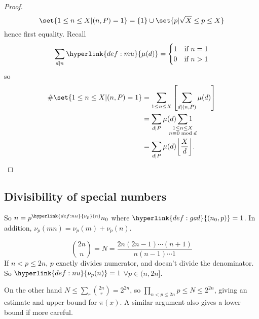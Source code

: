 \documentclass{article}
\DeclarePairedDelimiter\floor{\lfloor}{\rfloor}
\begin{document}
\begin{proof}
    \begin{equation*}
        \set{1 \leq n \leq X | (n, P) = 1} = \{1\} \cup \set{p | \sqrt{X} \leq p \leq X}
    \end{equation*}
    hence first equality. Recall
    \begin{gather*}
        \sum_{d \mid n} \hyperlink{def:mu}{\mu(d)} =
        \begin{cases}
            1 & \text{if } n = 1 \\
            0 & \text{if } n > 1
        \end{cases}
    \end{gather*}
        so
    \begin{align*}
        \# \set{1 \leq n \leq X | (n, P) = 1} &= \sum_{1 \leq n \leq X} \left[ \sum_{d \mid (n, P)} \mu(d)\right] \\
                                              &= \sum_{d \mid P} \mu(d) \sum_{\mathclap{\substack{1 \leq n \leq X \\ n \equiv 0 \bmod{d}}}} 1 \\
                                              &= \sum_{d \mid P} \mu(d) \floor*{\frac{X}{d}}. \qedhere
    \end{align*}
\end{proof}

\subsection{Divisibility of special numbers}

So $n = p^{\hyperlink{def:nu}{\nu_p}(n)} n_0$ where $\hyperlink{def:gcd}{(n_0, p)} = 1$.
In addition, $\nu_p(mn) = \nu_p(m) + \nu_p(n)$.

\begin{eg}
    \begin{equation*}
        \binom{2n}{n} = N = \frac{2n (2n-1) \dotsm (n+1)}{n (n-1) \dotsm 1}
    \end{equation*}
    If $n < p \leq 2n$, $p$ exactly divides numerator, and doesn't divide the denominator.
    So $\hyperlink{def:nu}{\nu_p(n)} = 1$ $\forall p \in (n, 2n]$.

    On the other hand $N \leq \sum_r \binom{2n}{r} = 2^{2n}$, so $\prod_{n < p \leq 2n} p \leq N \leq 2^{2n}$, giving an estimate and upper bound for $\pi(x)$.
    A similar argument also gives a lower bound if more careful.
\end{eg}
\end{document}

